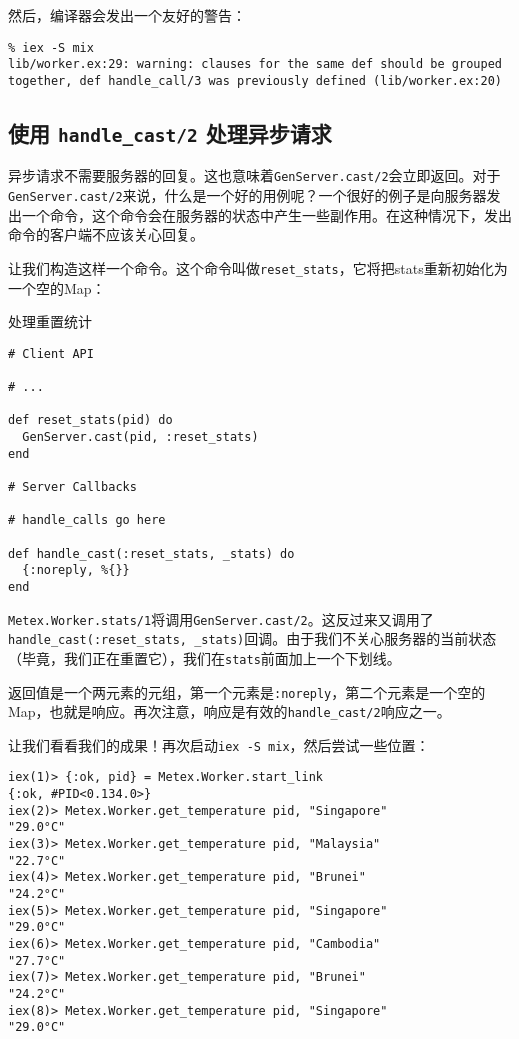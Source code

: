 然后，编译器会发出一个友好的警告：

\begin{code}{}
\begin{verbatim}
% iex -S mix
lib/worker.ex:29: warning: clauses for the same def should be grouped together, def handle_call/3 was previously defined (lib/worker.ex:20)
\end{verbatim}
\end{code}


\subsection{使用 \texttt{handle\_cast/2} 处理异步请求}

异步请求不需要服务器的回复。这也意味着\texttt{GenServer.cast/2}会立即返回。对于\texttt{GenServer.cast/2}来说，什么是一个好的用例呢？一个很好的例子是向服务器发出一个命令，这个命令会在服务器的状态中产生一些副作用。在这种情况下，发出命令的客户端不应该关心回复。

让我们构造这样一个命令。这个命令叫做\texttt{reset\_stats}，它将把stats重新初始化为一个空的Map：

\begin{code}{处理重置统计}
\begin{verbatim}
# Client API

# ...

def reset_stats(pid) do
  GenServer.cast(pid, :reset_stats)
end

# Server Callbacks

# handle_calls go here

def handle_cast(:reset_stats, _stats) do
  {:noreply, %{}}
end
\end{verbatim}
\label{lst:hangle_reset_stats}
\end{code}

\texttt{Metex.Worker.stats/1}将调用\texttt{GenServer.cast/2}。这反过来又调用了\texttt{handle\_cast(:reset\_stats, \_stats)}回调。由于我们不关心服务器的当前状态（毕竟，我们正在重置它），我们在\texttt{stats}前面加上一个下划线。

返回值是一个两元素的元组，第一个元素是\texttt{:noreply}，第二个元素是一个空的Map，也就是响应。再次注意，响应是有效的\texttt{handle\_cast/2}响应之一。

让我们看看我们的成果！再次启动\texttt{iex -S mix}，然后尝试一些位置：

\begin{code}{}
\begin{verbatim}
iex(1)> {:ok, pid} = Metex.Worker.start_link
{:ok, #PID<0.134.0>}
iex(2)> Metex.Worker.get_temperature pid, "Singapore"
"29.0°C"
iex(3)> Metex.Worker.get_temperature pid, "Malaysia"
"22.7°C"
iex(4)> Metex.Worker.get_temperature pid, "Brunei"
"24.2°C"
iex(5)> Metex.Worker.get_temperature pid, "Singapore"
"29.0°C"
iex(6)> Metex.Worker.get_temperature pid, "Cambodia"
"27.7°C"
iex(7)> Metex.Worker.get_temperature pid, "Brunei"
"24.2°C"
iex(8)> Metex.Worker.get_temperature pid, "Singapore"
"29.0°C"
\end{verbatim}
\end{code}

